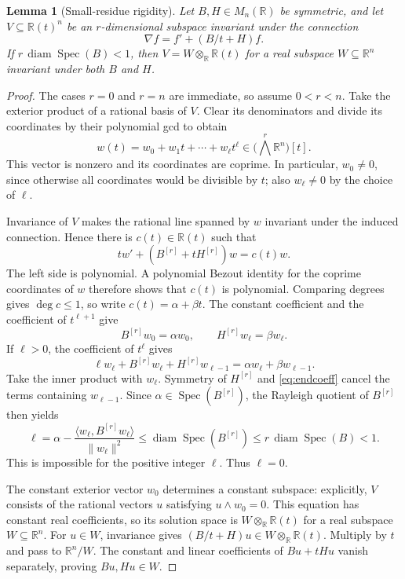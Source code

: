 \documentclass[11pt,letterpaper]{article}
\newtheorem{lemma}[theorem]{Lemma}
\theoremstyle{definition}\newtheorem{definition}[theorem]{Definition}
\theoremstyle{remark}\newtheorem{remark}[theorem]{Remark}
\DeclareMathOperator{\diam}{diam}\DeclareMathOperator{\Spec}{Spec}
\newcommand{\R}{\mathbb R}\newcommand{\Q}{\mathbb Q}\newcommand{\Z}{\mathbb Z}
\begin{document}
\begin{lemma}[Small-residue rigidity]\label{lem:rigidity}
Let $B,H\in M_n(\R)$ be symmetric, and let $V\subseteq\R(t)^n$ be an
$r$-dimensional subspace invariant under the connection
\[
\nabla f=f'+(B/t+H)f.
\]
If $r\,\diam\Spec(B)<1$, then
$V=W\otimes_{\R}\R(t)$ for a real subspace $W\subseteq\R^n$ invariant under
both $B$ and $H$.
\end{lemma}
\begin{proof}
The cases $r=0$ and $r=n$ are immediate, so assume $0<r<n$.
Take the exterior product of a rational basis of $V$. Clear its denominators
and divide its coordinates by their polynomial gcd to obtain
\[
w(t)=w_0+w_1t+\cdots+w_\ell t^\ell
\in \bigl(\textstyle\bigwedge^r\R^n\bigr)[t].
\]
This vector is nonzero and its coordinates are coprime. In particular,
$w_0\ne0$, since otherwise all coordinates would be divisible by $t$; also
$w_\ell\ne0$ by the choice of $\ell$.

Invariance of $V$ makes the rational line spanned by $w$ invariant under the
induced connection. Hence there is $c(t)\in\R(t)$ such that
\[
tw'+(B^{[r]}+tH^{[r]})w=c(t)w.
\]
The left side is polynomial. A polynomial Bezout identity for the coprime
coordinates of $w$ therefore shows that $c(t)$ is polynomial. Comparing
degrees gives $\deg c\le1$, so write $c(t)=\alpha+\beta t$.
The constant coefficient and the coefficient of $t^{\ell+1}$ give
\begin{equation}\label{eq:endcoeff}
B^{[r]}w_0=\alpha w_0,
\qquad H^{[r]}w_\ell=\beta w_\ell.
\end{equation}
If $\ell>0$, the coefficient of $t^\ell$ gives
\[
\ell w_\ell+B^{[r]}w_\ell+H^{[r]}w_{\ell-1}
=\alpha w_\ell+\beta w_{\ell-1}.
\]
Take the inner product with $w_\ell$. Symmetry of $H^{[r]}$ and
\eqref{eq:endcoeff} cancel the terms containing $w_{\ell-1}$. Since
$\alpha\in\Spec(B^{[r]})$, the Rayleigh quotient of $B^{[r]}$ then yields
\begin{equation}\label{eq:integergap}
\ell=\alpha-
\frac{\langle w_\ell,B^{[r]}w_\ell\rangle}{\|w_\ell\|^2}
\le\diam\Spec(B^{[r]})
\le r\,\diam\Spec(B)<1.
\end{equation}
This is impossible for the positive integer $\ell$. Thus $\ell=0$.

The constant exterior vector $w_0$ determines a constant subspace: explicitly,
$V$ consists of the rational vectors $u$ satisfying $u\wedge w_0=0$.
This equation has constant real coefficients, so its solution space is
$W\otimes_\R\R(t)$ for a real subspace $W\subseteq\R^n$.
For $u\in W$, invariance gives $(B/t+H)u\in W\otimes_\R\R(t)$.
Multiply by $t$ and pass to $\R^n/W$. The constant and linear coefficients
of $Bu+tHu$ vanish separately, proving $Bu,Hu\in W$.
\end{proof}
\end{document}
